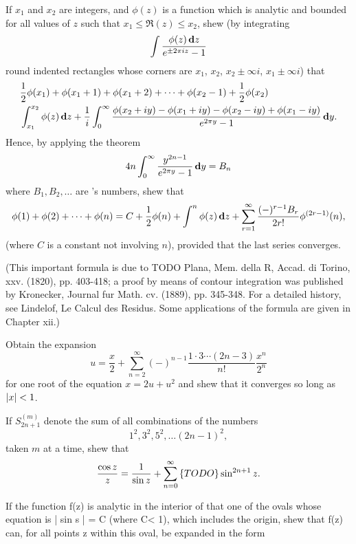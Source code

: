 \begin{wandwmiscexamples}
  \begin{wandwmiscexample}
    If $x_{1}$ and $x_{2}$ are integers, and $\phi(z)$ is a function
    which is analytic and bounded for all values of $z$ such that
    $x_{1} \leq \Re(z) \leq x_{2}$, shew (by integrating
    $$
    \int \frac{\phi(z) \, \mathbf{d} z}{ e^{\pm 2 \pi i z} - 1 }
    $$
    round indented rectangles whose corners are
    $x_{1}$, $x_{2}$, $x_{2} \pm \infty i$, $x_{1} \pm \infty i$)
    that
    \begin{align*}
      &
      \half \phi(x_{1})
      + \phi(x_{1} + 1)
      + \phi(x_{1} + 2)
      + \cdots
      + \phi(x_{2} - 1)
      + \half \phi(x_{2})
      \hfill
      \\
      &
      \hfill
      \int_{x_{1}}^{x_{2}} \phi(z) \dmeasure z
      +
      \frac{1}{i}
      \int_{0}^{\infty}
      \frac{ \phi(x_{2}+iy) - \phi(x_{1}+iy)
        - \phi(x_{2}-iy) + \phi(x_{1}-iy)}{ e^{2 \pi y} - 1 }
      \dmeasure y.
    \end{align*}
    Hence, by applying the theorem
    $$
    4n
    \int_{0}^{\infty}
    \frac{y^{2n-1}}{e^{2 \pi y} - 1}
    \, \mathbf{d} y
    =
    B_{n}
    $$
    where $B_{1}, B_{2}, \ldots$ are \Bernoulli's numbers, shew that
    $$
    \phi(1) + \phi(2) + \cdots + \phi(n)
    =
    C
    + \frac{1}{2} \phi(n)
    + \int^{n} \phi(z) \, \mathbf{d} z
    +
    \sum_{r=1}^{\infty}
    \frac{(-)^{r-1} B_{r}}{2r!} \phi^{(2r-1)}(n),
    $$
    (where $C$ is a constant not involving $n$), provided that the
    last series converges.

    (This important formula is due to TODO Plana, Mem. della R, Accad. di
    Torino, xxv. (1820), pp. 403-418; a proof by means of contour
    integration was published by Kronecker, Journal fur Math. cv. (1889),
    pp. 345-348. For a detailed history, see Lindelof, Le Calcul des
    Residus. Some applications of the formula are given in Chapter xii.)
  \end{wandwmiscexample}
  \begin{wandwmiscexample}
    Obtain the expansion
    $$
    u
    =
    \frac{x}{2}
    +
    \sum_{n=2}^{\infty}
    (-)^{n-1}
    \frac{1 \cdot 3 \cdots (2n-3)}{n!}
    \frac{x^{n}}{2^{n}}
    $$
    for one root of the equation
    $x = 2u + u^{2}$ and shew that it converges so
    long as $\left| x \right| < 1$.
  \end{wandwmiscexample}
  \begin{wandwmiscexample}
    If $S^{(m)}_{2n+1}$ denote the sum of all combinations of the numbers
    $$
    1^{2}, 3^{2}, 5^{2}, \ldots (2n-1)^{2},
    $$
    taken $m$ at a time, shew that
    $$
    \frac{\cos z}{z}
    =
    \frac{1}{\sin z}
    +
    \sum_{n=0}^{\infty}
    \left\{ 
      TODO
     \right\}
    \sin^{2n+1} z.
    $$
  \end{wandwmiscexample}
  \begin{wandwmiscexample}
    If the function f(z) is analytic in the interior of that one of
    the ovals whose equation is | sin s | = C (where C< 1), which includes
    the origin, shew that f(z) can, for all points z within this oval, be
    expanded in the form


\end{wandwmiscexample}
\end{wandwmiscexamples}
